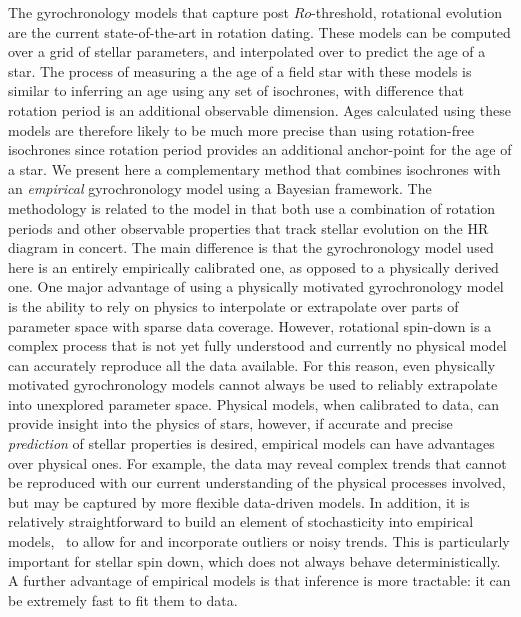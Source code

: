 The gyrochronology models that capture post $Ro$-threshold, rotational
evolution \citep{vansaders2016} are the current state-of-the-art in rotation
dating.
These models can be computed over a grid of stellar parameters, and
interpolated over to predict the age of a star.
The process of measuring a the age of a field star with these models is
similar to inferring an age using any set of isochrones, with difference that
rotation period is an additional observable dimension.
Ages calculated using these models are therefore likely to be much more
precise than using rotation-free isochrones since rotation period provides an
additional anchor-point for the age of a star.
We present here a complementary method that combines isochrones with an {\it
empirical} gyrochronology model using a Bayesian framework.
The methodology is related to the \citet{vansaders2016} model in that both use
a combination of rotation periods and other observable properties that track
stellar evolution on the HR diagram in concert.
The main difference is that the gyrochronology model used here is an entirely
empirically calibrated one, as opposed to a physically derived one.
One major advantage of using a physically motivated gyrochronology model is
the ability to rely on physics to interpolate or extrapolate over parts of
parameter space with sparse data coverage.
However, rotational spin-down is a complex process that is not yet fully
understood and currently no physical model can accurately reproduce all the
data available.
For this reason, even physically motivated gyrochronology models cannot always
be used to reliably extrapolate into unexplored parameter space.
Physical models, when calibrated to data, can provide insight into the physics
of stars, however, if accurate and precise {\it prediction} of stellar
properties is desired, empirical models can have advantages over physical
ones.
For example, the data may reveal complex trends that cannot be reproduced with
our current understanding of the physical processes involved, but may be
captured by more flexible data-driven models.
In addition, it is relatively straightforward to build an element of
stochasticity into empirical models, \ie\ to allow for and incorporate
outliers or noisy trends.
This is particularly important for stellar spin down, which does not always
behave deterministically.
A further advantage of empirical models is that inference is more tractable:
it can be extremely fast to fit them to data.
